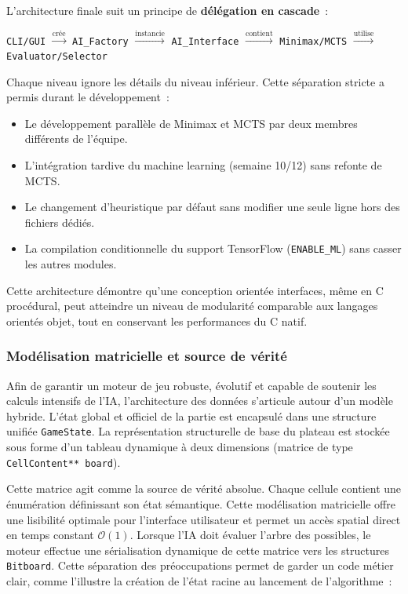 \documentclass[a4paper]{article}
\begin{document}
L'architecture finale suit un principe de \textbf{délégation en cascade}~:

\begin{center}
\texttt{CLI/GUI} $\xrightarrow{\text{crée}}$ \texttt{AI\_Factory} $\xrightarrow{\text{instancie}}$ \texttt{AI\_Interface} $\xrightarrow{\text{contient}}$ \texttt{Minimax/MCTS} $\xrightarrow{\text{utilise}}$ \texttt{Evaluator/Selector}
\end{center}

Chaque niveau ignore les détails du niveau inférieur. Cette séparation stricte a permis durant le développement~:
\begin{itemize}
    \item Le développement parallèle de Minimax et MCTS par deux membres différents de l'équipe.
    \item L'intégration tardive du machine learning (semaine 10/12) sans refonte de MCTS.
    \item Le changement d'heuristique par défaut sans modifier une seule ligne hors des fichiers dédiés.
    \item La compilation conditionnelle du support TensorFlow (\texttt{ENABLE\_ML}) sans casser les autres modules.
\end{itemize}

Cette architecture démontre qu'une conception orientée interfaces, même en C procédural, peut atteindre un niveau de modularité comparable aux langages orientés objet, tout en conservant les performances du C natif.

\subsubsection{Modélisation matricielle et source de vérité}
Afin de garantir un moteur de jeu robuste, évolutif et capable de soutenir les calculs intensifs de l'IA, l'architecture des données s'articule autour d'un modèle hybride. L'état global et officiel de la partie est encapsulé dans une structure unifiée \texttt{GameState}. La représentation structurelle de base du plateau est stockée sous forme d'un tableau dynamique à deux dimensions (matrice de type \texttt{CellContent** board}).

Cette matrice agit comme la source de vérité absolue. Chaque cellule contient une énumération définissant son état sémantique. Cette modélisation matricielle offre une lisibilité optimale pour l'interface utilisateur et permet un accès spatial direct en temps constant $\mathcal{O}(1)$. Lorsque l'IA doit évaluer l'arbre des possibles, le moteur effectue une sérialisation dynamique de cette matrice vers les structures \texttt{Bitboard}. Cette séparation des préoccupations permet de garder un code métier clair, comme l'illustre la création de l'état racine au lancement de l'algorithme~:
\end{document}
